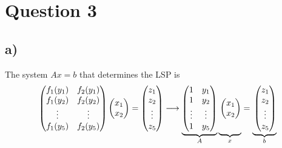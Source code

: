 \documentclass[12pt]{article}
\theoremstyle{definition}
\theoremstyle{definition}
\theoremstyle{definition}
\theoremstyle{definition}
\theoremstyle{definition}
\theoremstyle{example}
\theoremstyle{note}
\theoremstyle{remark}
\theoremstyle{example}
\begin{document}
	\section*{Question 3}
		\subsection*{a) }
			The system $Ax = b$ that determines the LSP is 
			\begin{gather*}
				\begin{pmatrix}
					f_{1} (y_{1})  &f_{2} (y_{1})  \\
					f_{1} (y_{2})  &f_{2} (y_{2})  \\
					\vdots & \vdots \\
					f_{1} (y_{5})  &f_{2} (y_{5})  
				\end{pmatrix}
				\begin{pmatrix}
					x_{1} \\ x_{2} 
				\end{pmatrix}
				=\begin{pmatrix}
					z_{1} \\ z_{2}\\ \vdots\\ z_{5}
				\end{pmatrix}
				\longrightarrow
				\underbrace{\begin{pmatrix}
				1 &y_{1}  \\
				1  &y_{2}  \\
				\vdots & \vdots \\
				1  &y_{5} 
				\end{pmatrix}}_{A}
				\underbrace{
					\vphantom{\begin{pmatrix}
						1 &y_{1}  \\
						1  &y_{2}  \\
						\vdots & \vdots \\
						1  &y_{5} 
						\end{pmatrix}}\begin{pmatrix}
				x_{1} \\ x_{2} 
				\end{pmatrix}}_{x}
				=\underbrace{\vphantom{\begin{pmatrix}
						1 &y_{1}  \\
						1  &y_{2}  \\
						\vdots & \vdots \\
						1  &y_{5} 
						\end{pmatrix}}\begin{pmatrix}
				z_{1} \\ z_{2} \\\vdots\\ z_{5}
				\end{pmatrix}}_{b}
			\end{gather*}
\end{document}
